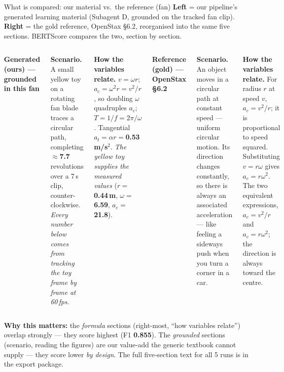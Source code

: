 \documentclass[aspectratio=169,10pt]{beamer}
\newcommand{\hl}[1]{{\bfseries\color{cAccent}#1}}
\begin{document}
\begin{frame}{What is compared: our material vs.\ the reference (fan)}
\scriptsize
\textbf{Left} = our pipeline's generated learning material (Subagent D, grounded on the tracked fan clip). \textbf{Right} = the gold reference, OpenStax \S6.2, reorganised into the same five sections. BERTScore compares the two, section by section.
\vspace{0.4em}
\begin{columns}[T]
\begin{tcolorbox}[colback=cPed!6,colframe=cPed!55,boxrule=0.4pt,left=3pt,right=3pt,top=2pt,bottom=2pt]
{\scriptsize\textbf{\color{cPed}Generated (ours) --- grounded in this fan}}
\end{tcolorbox}
\vspace{2pt}
{\tiny\textbf{Scenario.} A small yellow toy on a rotating fan blade traces a circular path, completing $\approx$\hl{7.7} revolutions over a 7\,s clip, counter-clockwise. \emph{Every number below comes from tracking the toy frame by frame at 60\,fps.}\par\vspace{3pt}
\textbf{How the variables relate.} $v=\omega r$; $a_c=\omega^2 r=v^2/r$, so doubling $\omega$ quadruples $a_c$; $T=1/f=2\pi/\omega$. Tangential $a_t=\alpha r=$\hl{0.53\,m/s$^2$}. \emph{The yellow toy supplies the measured values} ($r=$\hl{0.44\,m}, $\omega=$\hl{6.59}, $a_c=$\hl{21.8}).}
\begin{tcolorbox}[colback=cMeas!6,colframe=cMeas!55,boxrule=0.4pt,left=3pt,right=3pt,top=2pt,bottom=2pt]
{\scriptsize\textbf{\color{cMeas}Reference (gold) --- OpenStax \S6.2}}
\end{tcolorbox}
\vspace{2pt}
{\tiny\textbf{Scenario.} An object moves in a circular path at constant speed --- uniform circular motion. Its direction changes constantly, so there is always an associated acceleration --- like feeling a sideways push when you turn a corner in a car.\par\vspace{3pt}
\textbf{How the variables relate.} For radius $r$ at speed $v$, $a_c=v^2/r$; it is proportional to speed squared. Substituting $v=r\omega$ gives $a_c=r\omega^2$. The two equivalent expressions, $a_c=v^2/r$ and $a_c=r\omega^2$; the direction is always toward the centre.}
\end{columns}
\vspace{0.5em}
{\scriptsize \textbf{Why this matters:} the \emph{formula} sections (right-most, ``how variables relate'') overlap strongly --- they score highest (F1 \hl{0.855}). The \emph{grounded} sections (scenario, reading the figures) are our value-add the generic textbook cannot supply --- they score lower \emph{by design}. The full five-section text for all 5 runs is in the export package.}\\[2pt]

\end{frame}
\end{document}
